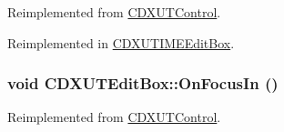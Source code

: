 Reimplemented from \hyperlink{class_c_d_x_u_t_control_a58d0d118146c8853a7ccd27da9e3fcf3}{CDXUTControl}.

Reimplemented in \hyperlink{class_c_d_x_u_t_i_m_e_edit_box_ac656a213385fb3245938f0297d58d0de}{CDXUTIMEEditBox}.\hypertarget{class_c_d_x_u_t_edit_box_adc767031600f1ea99ebcf533e00d7948}{
\subsubsection[{OnFocusIn}]{\setlength{\rightskip}{0pt plus 5cm}void CDXUTEditBox::OnFocusIn ()}}
\label{class_c_d_x_u_t_edit_box_adc767031600f1ea99ebcf533e00d7948}


Reimplemented from \hyperlink{class_c_d_x_u_t_control_ab363eb5e296ddfc577f81bcd7667fd9b}{CDXUTControl}.

